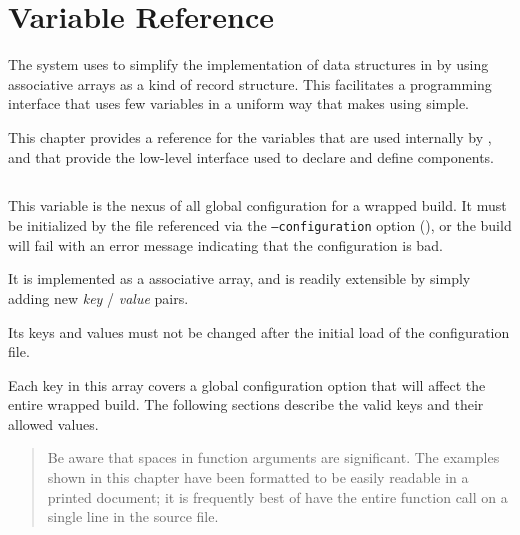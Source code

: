 %
%
%
%
\chapter{Variable Reference}

The \lmsbw system uses \gmsl to simplify the implementation of data
structures in \make by using associative arrays as a kind of record
structure.  This facilitates a programming interface that uses few
variables in a uniform way that makes using \lmsbw simple.

This chapter provides a reference for the variables that are used
internally by \lmsbw, and that provide the low-level interface used to
declare and define components.

\section{\lmsbwconfiguration}\label{variables:lmsbw-configuration}

This variable is the nexus of all global configuration for a wrapped
build.  It must be initialized by the file referenced via the \lmsbw
\texttt{--configuration} option (), or the
build will fail with an error message indicating that the
configuration is bad.

It is implemented as a \gmsl associative array, and is readily
extensible by simply adding new \emph{key} / \emph{value} pairs.

Its keys and values must not be changed after the initial load of the
configuration file.

Each key in this array covers a global configuration option that will
affect the entire wrapped build.  The following sections describe the
valid keys and their allowed values.

\begin{quote}
Be aware that spaces in \gnumake function arguments are significant.
The examples shown in this chapter have been formatted to be easily
readable in a printed document; it is frequently best of have the
entire function call on a single line in the source file.
\end{quote}

